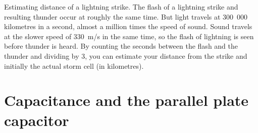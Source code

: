 Estimating distance of a lightning strike. The flash of a
lightning strike and resulting thunder occur at roughly the same
time. But light travels at 300~000 kilometres in a second, almost
a million times the speed of sound. Sound travels at the slower
speed of 330~m/s in the same time, so the flash of lightning is
seen before thunder is heard. By counting the seconds between the
flash and the thunder and dividing by 3, you can estimate your
distance from the strike and initially the actual storm cell (in
kilometres).
\section{Capacitance and the parallel plate capacitor}
\label{p:em:es11:c}


